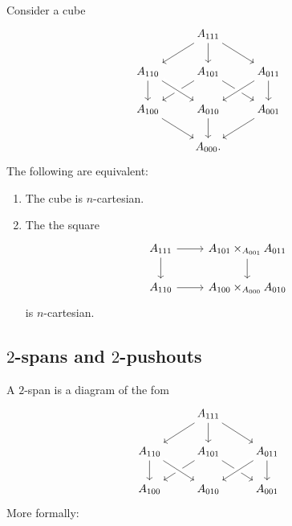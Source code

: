 \begin{conj}
Consider a cube
\begin{equation*}
\begin{tikzcd}
& A_{111} \arrow[dl] \arrow[d] \arrow[dr] \\
A_{110} \arrow[d] & A_{101} \arrow[dl] \arrow[dr] & A_{011} \arrow[d] \\
A_{100} \arrow[dr] & A_{010} \arrow[d] \arrow[from=ul,crossing over] \arrow[from=ur,crossing over] & A_{001} \arrow[dl] \\
& A_{000}.
\end{tikzcd}
\end{equation*}
The following are equivalent:
\begin{enumerate}
\item The cube is $n$-cartesian.
\item The the square
\begin{equation*}
\begin{tikzcd}
A_{111} \arrow[r] \arrow[d] & A_{101}\times_{A_{001}} A_{011} \arrow[d] \\
A_{110} \arrow[r] & A_{100} \times_{A_{000}} A_{010}
\end{tikzcd}
\end{equation*}
is $n$-cartesian.
\end{enumerate}
\end{conj}

\subsection{$2$-spans and $2$-pushouts}

A $2$-span is a diagram of the fom
\begin{equation*}
\begin{tikzcd}
& A_{111} \arrow[dl] \arrow[d] \arrow[dr] \\
A_{110} \arrow[d] & A_{101} \arrow[dl] \arrow[dr] & A_{011} \arrow[d] \\
A_{100} & A_{010} \arrow[from=ul,crossing over] \arrow[from=ur,crossing over] & A_{001}
\end{tikzcd}
\end{equation*}
More formally:

